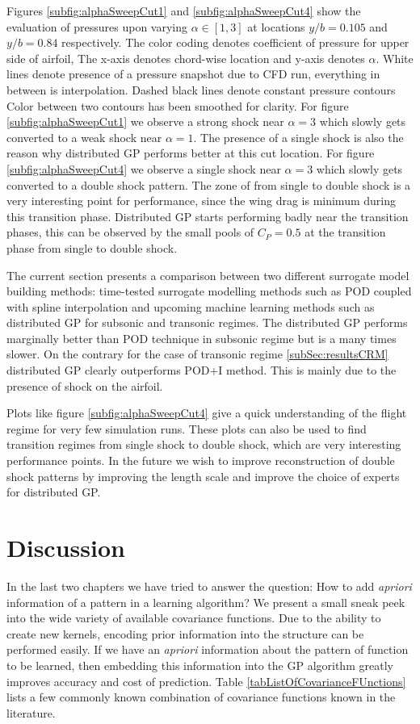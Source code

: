 Figures \ref{subfig:alphaSweepCut1} and \ref{subfig:alphaSweepCut4} show the evaluation of pressures upon varying $\alpha \in [1, 3]$ at locations $y/b = 0.105$ and $y/b = 0.84$ respectively. The color coding denotes coefficient of pressure for upper side of airfoil, The x-axis denotes chord-wise location and y-axis denotes $\alpha$. White lines denote presence of a pressure snapshot due to CFD run, everything in between is interpolation. Dashed black lines denote constant pressure contours Color between two contours has been smoothed for clarity. For figure \ref{subfig:alphaSweepCut1} we observe a strong shock near $\alpha = 3$ which slowly gets converted to a weak shock near $\alpha = 1$. The presence of a single shock is also the reason why distributed GP performs better at this cut location. For figure \ref{subfig:alphaSweepCut4} we observe a single shock near $\alpha = 3$ which slowly gets converted to a double shock pattern. The zone of from single to double shock is a very interesting point for performance, since the wing drag is minimum during this transition phase. Distributed GP starts performing badly near the transition phases, this can be observed by the small pools of $C_{P} = 0.5$ at the transition phase from single to double shock. 

The current section presents a comparison between two different surrogate model building methods: time-tested surrogate modelling methods such as POD coupled with spline interpolation and upcoming machine learning methods such as distributed GP for subsonic and transonic regimes. The distributed GP performs marginally better than POD technique in subsonic regime but is a many times slower. On the contrary for the case of transonic regime \ref{subSec:resultsCRM} distributed GP clearly outperforms POD+I method. This is mainly due to the presence of shock on the airfoil. 

Plots like figure \ref{subfig:alphaSweepCut4} give a quick understanding of the flight regime for very few simulation runs. These plots can also be used to find transition regimes from single shock to double shock, which are very interesting performance points. In the future we wish to improve reconstruction of double shock patterns by improving the length scale and improve the choice of experts for distributed GP.

\section{Discussion}\label{subsec:ExpressingStructureKernelConclusion}
In the last two chapters we have tried to answer the question: How to add \textit{apriori} information of a pattern in a learning algorithm? We present a small sneak peek into the wide variety of available covariance functions. Due to the ability to create new kernels, encoding prior information into the structure can be performed easily. If we have an \textit{apriori} information about the pattern of function to be learned, then embedding this information into the GP algorithm greatly improves accuracy and cost of prediction. Table \ref{tabListOfCovarianceFUnctions} lists a few commonly known combination of covariance functions known in the literature. 

